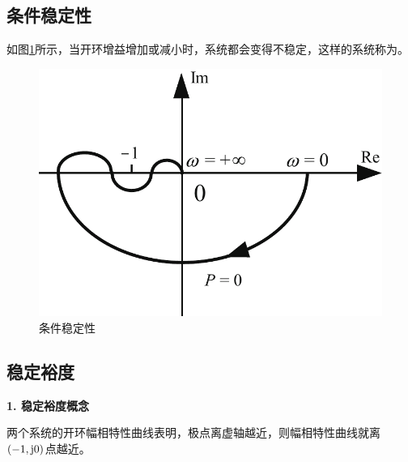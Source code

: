 \subsection{条件稳定性}
\vspace*{-0.5em}
如图\ref{条件稳定性}所示，当开环增益增加或减小时，系统都会变得不稳定，这样的系统称为。
\begin{figure}[!htb]
	\centering
	\includegraphics[width=0.4\linewidth]{pic/条件稳定性.pdf}
	\vspace*{-1em}
	\caption{条件稳定性}
	\label{条件稳定性}
\end{figure}

\subsection{稳定裕度}
\noindent \textbf{1. 稳定裕度概念}

两个系统的开环幅相特性曲线表明，极点离虚轴越近，则幅相特性曲线就离$(-1, \text{j}0)$点越近。

